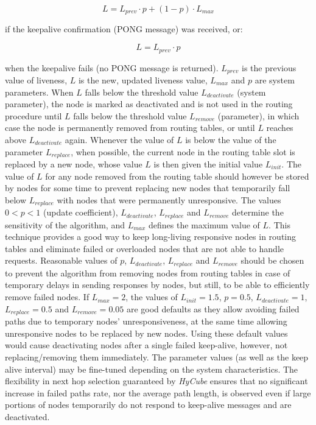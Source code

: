 \begin{equation}
L = L_{prev} \cdot p + (1-p) \cdot L_{max}
\end{equation}

\noindent
if the keepalive confirmation (PONG message) was received, or:

\begin{equation}
L = L_{prev} \cdot p
\end{equation}

\noindent
when the keepalive fails (no PONG message is returned). $L_{prev}$ is the previous value of liveness, $L$ is the new, updated liveness value, $L_{max}$ and $p$ are system parameters. When $L$ falls below the threshold value $L_{deactivate}$ (system parameter), the node is marked as deactivated and is not used in the routing procedure until $L$ falls below the threshold value $L_{remove}$ (parameter), in which case the node is permanently removed from routing tables, or until $L$ reaches above $L_{deactivate}$ again. Whenever the value of $L$ is below the value of the parameter $L_{replace}$, when possible, the current node in the routing table slot is replaced by a new node, whose value $L$ is then given the initial value $L_{init}$. The value of $L$ for any node removed from the routing table should however be stored by nodes for some time to prevent replacing new nodes that temporarily fall below $L_{replace}$ with nodes that were permanently unresponsive. The values $0 < p < 1$ (update coefficient), $L_{deactivate}$, $L_{replace}$ and $L_{remove}$ determine the sensitivity of the algorithm, and $L_{max}$ defines the maximum value of $L$. This technique provides a good way to keep long-living responsive nodes in routing tables and eliminate failed or overloaded nodes that are not able to handle requests. Reasonable values of $p$, $L_{deactivate}$, $L_{replace}$ and $L_{remove}$ should be chosen to prevent the algorithm from removing nodes from routing tables in case of temporary delays in sending responses by nodes, but still, to be able to efficiently remove failed nodes. If $L_{max} = 2$, the values of $L_{init} = 1.5$, $p = 0.5$, $L_{deactivate} = 1$, $L_{replace} = 0.5$ and $L_{remove} = 0.05$ are good defaults as they allow avoiding failed paths due to temporary nodes' unresponsiveness, at the same time allowing unresponsive nodes to be replaced by new nodes. Using these default values would cause deactivating nodes after a single failed keep-alive, however, not replacing/removing them immediately. The parameter values (as well as the keep alive interval) may be fine-tuned depending on the system characteristics. The flexibility in next hop selection guaranteed by \emph{HyCube} ensures that no significant increase in failed paths rate, nor the average path length, is observed even if large portions of nodes temporarily do not respond to keep-alive messages and are deactivated.





